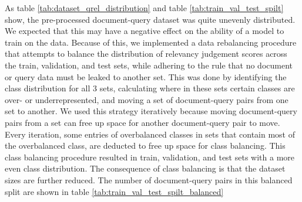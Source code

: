 \documentclass[sigconf, natbib=true]{acmart}
\begin{document}
As table \ref{tab:dataset_qrel_distribution} and table \ref{tab:train_val_test_spilt} show, the pre-processed document-query dataset was quite unevenly distributed.
We expected that this may have a negative effect on the ability of a model to train on the data.
Because of this, we implemented a data rebalancing procedure that attempts to balance the distribution of relevancy judgement scores across the train, validation, and test sets, while adhering to the rule that no document or query data must be leaked to another set.
This was done by identifying the class distribution for all 3 sets, calculating where in these sets certain classes are over- or underrepresented, and moving a set of document-query pairs from one set to another. We used this strategy iteratively because moving document-query pairs from a set can free up space for another document-query pair to move. Every iteration, some entries of overbalanced classes in sets that contain most of the overbalanced class, are deducted to free up space for class balancing. 
This class balancing procedure resulted in train, validation, and test sets with a more even class distribution. The consequence of class balancing is that the dataset sizes are further reduced. The number of document-query pairs in this balanced split are shown in table \ref{tab:train_val_test_spilt_balanced}
\end{document}
